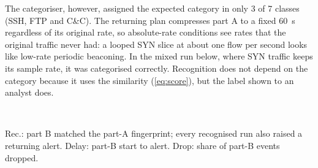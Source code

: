 \documentclass[conference]{IEEEtran}
\begin{document}
The categoriser, however, assigned the expected category in only 3 of 7 classes (SSH, FTP and C\&C). The returning plan compresses part A to a fixed 60~s regardless of its original rate, so absolute-rate conditions see rates that the original traffic never had: a looped SYN slice at about one flow per second looks like low-rate periodic beaconing. In the mixed run below, where SYN traffic keeps its sample rate, it was categorised correctly. Recognition does not depend on the category because it uses the similarity (\ref{eq:score}), but the label shown to an analyst does.

\begin{table}[t]
\centering
\caption{E2: Returning-attacker recognition (6 runs per class)}
\label{tab:e2}
\footnotesize
\setlength{\tabcolsep}{2.4pt}
\\[2pt]
\raggedright\scriptsize Rec.: part B matched the part-A fingerprint; every recognised run also raised a returning alert. Delay: part-B start to alert. Drop: share of part-B events dropped.
\end{table}
\end{document}
